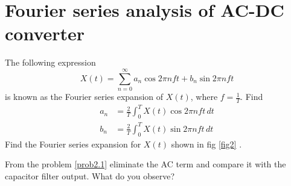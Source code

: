 \documentclass[journal,12pt,twocolumn]{IEEEtran}
\begin{document}
\section{Fourier series analysis of AC-DC converter}
\begin{problem}
The following expression
%
\begin{equation}
X(t) = \sum_{n=0}^{\infty}a_n\cos 2\pi n f t + b_n \sin 2 \pi n f t
\end{equation}
is known as the Fourier series expansion of $X(t)$, where $f = \frac{1}{T}$.  Find 
\begin{align}
a_n &= \frac{2}{T} \int_{0}^{T}X(t) \cos 2\pi nf t \, dt \\
b_n &= \frac{2}{T} \int_{0}^{T}X(t) \sin 2\pi nf t \, dt
\end{align}
Find the Fourier series expansion for $X(t)$ shown in fig \ref{fig2} . \label{prob2.1}
\end{problem}
\begin{problem}
From the problem  \ref{prob2.1} eliminate the AC term and compare it with the capacitor filter output. What do you observe?
\end{problem}
\end{document}
